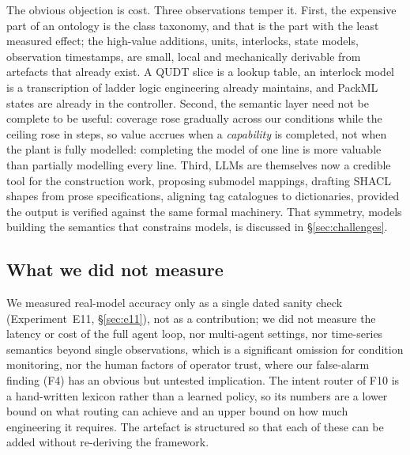 The obvious objection is cost. Three observations temper it. First, the
expensive part of an ontology is the class taxonomy, and that is the part with
the least measured effect; the high-value additions, units, interlocks, state
models, observation timestamps, are small, local and mechanically derivable
from artefacts that already exist. A QUDT slice is a lookup table, an interlock
model is a transcription of ladder logic engineering already maintains, and
PackML states are already in the controller. Second, the semantic layer need not
be complete to be useful: coverage rose gradually across our conditions while
the ceiling rose in steps, so value accrues when a \emph{capability} is
completed, not when the plant is fully modelled: completing the model of one line
is more valuable than partially modelling every line. Third, LLMs are themselves
now a credible tool for the construction work, proposing submodel mappings,
drafting SHACL shapes from prose specifications, aligning tag catalogues to
dictionaries, provided the output is verified against the same formal
machinery. That symmetry, models building the semantics that constrains models,
is discussed in \S\ref{sec:challenges}.

\subsection{What we did not measure}

We measured real-model accuracy only as a single dated sanity check
(Experiment~E11, \S\ref{sec:e11}), not as a contribution; we did not measure the
latency or cost of the full agent loop, nor multi-agent settings, nor time-series
semantics beyond single observations, which is a significant omission for
condition monitoring, nor the human factors of operator trust, where our
false-alarm finding (F4) has an obvious but untested implication. The intent router of F10 is a hand-written lexicon rather than a
learned policy, so its numbers are a lower bound on what routing can achieve and
an upper bound on how much engineering it requires. The artefact is structured so
that each of these can be added without re-deriving the framework.
